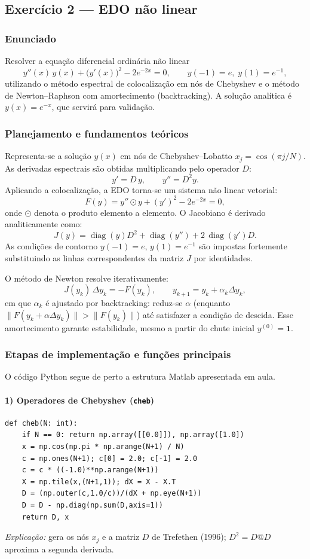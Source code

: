 \documentclass[12pt,a4paper]{article}
\begin{document}
\subsection{Exercício 2 — EDO não linear}

\subsubsection*{Enunciado}
Resolver a equação diferencial ordinária não linear
\[
y''(x)\,y(x) + \bigl(y'(x)\bigr)^2 - 2e^{-2x} = 0,\qquad y(-1)=e,\;y(1)=e^{-1},
\]
utilizando o método espectral de colocalização em nós de Chebyshev e o método de Newton–Raphson com amortecimento (backtracking).  
A solução analítica é \(y(x)=e^{-x}\), que servirá para validação.

\subsubsection*{Planejamento e fundamentos teóricos}
Representa-se a solução \(y(x)\) em nós de Chebyshev–Lobatto \(x_j=\cos(\pi j/N)\).  
As derivadas espectrais são obtidas multiplicando pelo operador \(D\):  
\[
y' = D\,y,\qquad y'' = D^2y.
\]
Aplicando a colocalização, a EDO torna-se um sistema não linear vetorial:
\[
F(y)=y''\!\odot y + (y')^2 - 2e^{-2x}=0,
\]
onde \(\odot\) denota o produto elemento a elemento.  
O Jacobiano é derivado analiticamente como:
\[
J(y)=\operatorname{diag}(y)D^2 + \operatorname{diag}(y'') + 2\,\operatorname{diag}(y')D.
\]
As condições de contorno \(y(-1)=e\), \(y(1)=e^{-1}\) são impostas fortemente substituindo as linhas correspondentes da matriz \(J\) por identidades.

O método de Newton resolve iterativamente:
\[
J(y_k)\,\Delta y_k=-F(y_k),\qquad y_{k+1}=y_k+\alpha_k\Delta y_k,
\]
em que \(\alpha_k\) é ajustado por backtracking: reduz-se \(\alpha\) (enquanto \(\|F(y_k+\alpha\Delta y_k)\|>\|F(y_k)\|\)) até satisfazer a condição de descida.  
Esse amortecimento garante estabilidade, mesmo a partir do chute inicial \(y^{(0)}=\mathbf{1}\).

\subsubsection*{Etapas de implementação e funções principais}
O código Python segue de perto a estrutura Matlab apresentada em aula.

\paragraph{1) Operadores de Chebyshev (\texttt{cheb})}
\begin{verbatim}
def cheb(N: int):
    if N == 0: return np.array([[0.0]]), np.array([1.0])
    x = np.cos(np.pi * np.arange(N+1) / N)
    c = np.ones(N+1); c[0] = 2.0; c[-1] = 2.0
    c = c * ((-1.0)**np.arange(N+1))
    X = np.tile(x,(N+1,1)); dX = X - X.T
    D = (np.outer(c,1.0/c))/(dX + np.eye(N+1))
    D = D - np.diag(np.sum(D,axis=1))
    return D, x
\end{verbatim}
\textit{Explicação:} gera os nós \(x_j\) e a matriz \(D\) de Trefethen (1996); \(D^2=D@D\) aproxima a segunda derivada.
\end{document}
